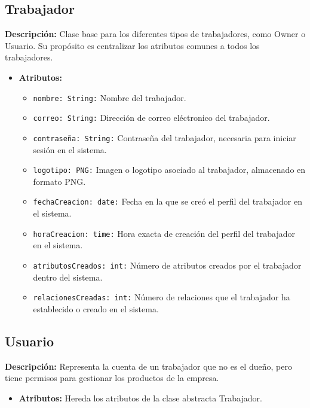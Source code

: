 \documentclass[12pt.a4paper]{article}
\begin{document}
\subsection{Trabajador}
     \textbf{Descripción:}  Clase base para los diferentes tipos de trabajadores, como Owner o Usuario. Su propósito es centralizar los atributos comunes a todos los trabajadores.

    \begin{itemize}
        \item {\textbf{Atributos:}}
        \begin{itemize}
            \item \texttt{nombre: String:} Nombre del trabajador.
            \item \texttt{correo: String:} Dirección de correo eléctronico del trabajador.
            \item \texttt{contraseña: String:} Contraseña del trabajador, necesaria para iniciar sesión en el sistema. 
            \item \texttt{logotipo: PNG:} Imagen o logotipo asociado al trabajador, almacenado en formato PNG.
            \item \texttt{fechaCreacion: date:} Fecha en la que se creó el perfil del trabajador en el sistema.
            \item \texttt{horaCreacion: time:} Hora exacta de creación del perfil del trabajador en el sistema. 
            \item \texttt{atributosCreados: int:} Número de atributos creados por el trabajador dentro del sistema. 
            \item \texttt{relacionesCreadas: int:} Número de relaciones que el trabajador ha establecido o creado en el sistema.
        \end{itemize}
    \end{itemize}
    
\subsection{Usuario}
     \textbf{Descripción:} Representa la cuenta de un trabajador que no es el dueño, pero tiene permisos para gestionar los productos de la empresa.
    \begin{itemize}
        \item {\textbf{Atributos:}} Hereda los atributos de la clase abstracta Trabajador.
    \end{itemize}
\end{document}
